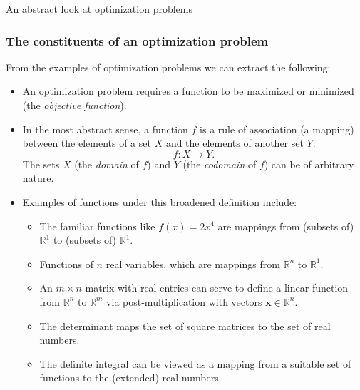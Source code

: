 \documentclass[10pt]{beamer}
\theoremstyle{definition}
\begin{document}
\begin{section}{An abstract look at optimization problems}
\begin{frame}[fragile]
\frametitle{The constituents of an optimization problem}
From the examples of optimization problems we can extract the following:
\begin{itemize} \itemsep1em
\item An optimization problem requires a function to be maximized or minimized (the \emph{objective function}).
\item In the most abstract sense, a function $ f $ is a rule of association (a mapping) between the elements of a set $ X $ and the elements of another set $ Y $:
\[ f: X \rightarrow Y. \] The sets $ X $ (the \emph{domain} of $ f $) and $ Y $ (the \emph{codomain} of $ f $) can be of arbitrary nature.
\item Examples of functions under this broadened definition include:
	\begin{itemize}
	\item The familiar functions like $ f(x) = 2x^4 $ are mappings from (subsets of) $ \mathbb{R}^1 $ to (subsets of) $ \mathbb{R}^1 $. 
	\item Functions of $ n $ real variables, which are mappings from $ \mathbb{R}^n $ to  $ \mathbb{R}^1 $.
	\item An $ m \times n $ matrix with real entries can serve to define a linear function from $ \mathbb{R}^n $ to $ \mathbb{R}^m $ via post-multiplication with vectors $ \mathbf{x} \in \mathbb{R}^n $.
	\item The determinant maps the set of square matrices to the set of real numbers.
	\item The definite integral can be viewed as a mapping from a suitable set of functions to the (extended) real numbers.
	\end{itemize}
\end{itemize}
\end{frame}


\end{section}
\end{document}
